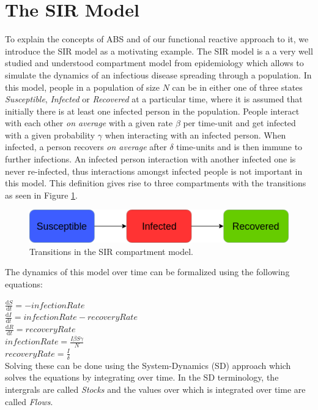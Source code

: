 \section{The SIR Model}
To explain the concepts of ABS and of our functional reactive approach to it, we introduce the SIR model as a motivating example. The SIR model is a a very well studied and understood compartment model from epidemiology which allows to simulate the dynamics of an infectious disease spreading through a population. In this model, people in a population of size $N$ can be in either one of three states \textit{Susceptible}, \textit{Infected} or \textit{Recovered} at a particular time, where it is assumed that initially there is at least one infected person in the population. People interact with each other \textit{on average} with a given rate $\beta$ per time-unit and get infected with a given probability $\gamma$ when interacting with an infected person. When infected, a person recovers \textit{on average} after $\delta$ time-units and is then immune to further infections. An infected person interaction with another infected one is never re-infected, thus interactions amongst infected people is not important in this model. This definition gives rise to three compartments with the transitions as seen in Figure \ref{fig:sir_transitions}.

\begin{figure}
	\centering
	\includegraphics[width=.4\textwidth, angle=0]{./fig/SIR_transitions.png}
	\caption{Transitions in the SIR compartment model.}
	\label{fig:sir_transitions}
\end{figure}

The dynamics of this model over time can be formalized using the following equations:

$\frac{\mathrm d S}{\mathrm d t} = -infectionRate$ \\
$\frac{\mathrm d I}{\mathrm d t} = infectionRate - recoveryRate$ \\
$\frac{\mathrm d R}{\mathrm d t} = recoveryRate$ \\

$infectionRate = \frac{I \beta S \gamma}{N}$ \\
$recoveryRate = \frac{I}{\delta}$ \\

Solving these can be done using the System-Dynamics (SD) approach which solves the equations by integrating over time. In the SD terminology, the intergrals are called \textit{Stocks} and the values over which is integrated over time are called \textit{Flows}.


